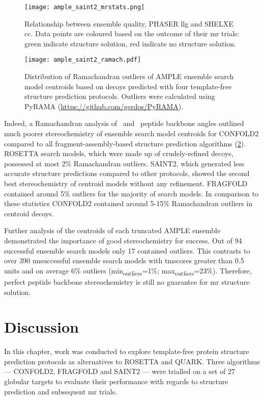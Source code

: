 \begin{figure}[H]
    \centering
    \texttt{[image: ample\_saint2\_mrstats.png]}
    \caption[Relationship between ensemble metrics]{Relationship between ensemble quality, PHASER \gls{llg} and SHELXE \gls{cc}. Data points are coloured based on the outcome of their \gls{mr} trials: green indicate structure solution, red indicate no structure solution.}
    \label{fig:ample_saint2_mrstats}
\end{figure}

\begin{figure}[H]
    \centering
    \texttt{[image: ample\_saint2\_ramach.pdf]}
    \caption[Ramachandran outliers of ensemble search model centroids]{Distribution of Ramachandran outliers of AMPLE ensemble search model centroids based on decoys predicted with four template-free structure prediction protocols. Outliers were calculated using PyRAMA (\href{https://github.com/gerdos/PyRAMA}{https://github.com/gerdos/PyRAMA}).}
    \label{fig:ample_saint2_ramach}
\end{figure}

Indeed, a Ramachandran analysis of \textphi\ and \textpsi\ peptide backbone angles outlined much poorer stereochemistry of ensemble search model centroids for CONFOLD2 compared to all fragment-assembly-based structure prediction algorithms (\cref{fig:ample_saint2_ramach}). ROSETTA search models, which were made up of crudely-refined decoys, possessed at most 2\% Ramachandran outliers. SAINT2, which generated less accurate structure predictions compared to other protocols, showed the second best stereochemistry of centroid models without any refinement.  FRAGFOLD contained around 5\% outliers for the majority of search models. In comparison to these statistics CONFOLD2 contained around 5-15\% Ramachandran outliers in centroid decoys. 

Further analysis of the centroids of each truncated AMPLE ensemble demonstrated the importance of good stereochemistry for success. Out of 94 successful ensemble search models only 17 contained outliers. This contrasts to over 390 unsuccessful ensemble search models with \gls{tmscore}s greater than 0.5 units and on average 6\% outliers (min\textsubscript{outliers}=1\%; max\textsubscript{outliers}=23\%). Therefore, perfect peptide backbone stereochemistry is still no guarantee for \gls{mr} structure solution. 

\section{Discussion}
In this chapter, work was conducted to explore template-free protein structure prediction protocols as alternatives to ROSETTA and QUARK. Three algorithms --- CONFOLD2, FRAGFOLD and SAINT2 --- were trialled on a set of 27 globular targets to evaluate their performance with regards to structure prediction and subsequent \gls{mr} trials.

